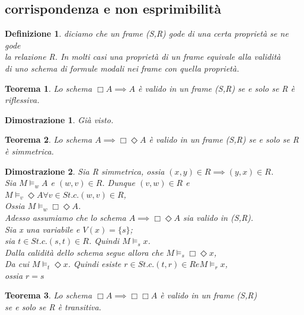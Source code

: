 \documentclass[a4paper,12pt]{article}
\theoremstyle{def}
\newtheorem*{definition}{Definizione}
\theoremstyle{prop}
\theoremstyle{esempio}
\theoremstyle{dimostrazione}
\newtheorem*{dimostrazione}{Dimostrazione}
\theoremstyle{teo}
\newtheorem*{teorema}{Teorema}
\theoremstyle{osservazione}
\begin{document}
\subsection{corrispondenza e non esprimibilità}
\begin{definition}
	diciamo che un frame (S,R) gode di una certa proprietà se ne gode\\
	la relazione R. In molti casi una proprietà di un frame equivale alla validità\\
	di uno schema di formule modali nei frame con quella proprietà.\\
\end{definition}
\begin{teorema}
	Lo schema \(\Box A \implies A\) è valido in un frame (S,R) se e solo se R è riflessiva.
\end{teorema}
\begin{dimostrazione}
	Già visto.
\end{dimostrazione}
\begin{teorema}
	Lo schema \( A \implies \Box \Diamond A\) è valido in un frame (S,R) se e solo se R è simmetrica.
\end{teorema}
\begin{dimostrazione}
	Sia R simmetrica, ossia \((x,y) \in R \implies (y,x) \in R\).\\
	Sia \(M \vDash_w A\) e \((w,v) \in R\). Dunque \((v,w) \in R\) e \(M \vDash_v \Diamond A \forall v \in S t.c. (w,v) \in R\),\\
	Ossia \(M \vDash_w \Box \Diamond A\).\\
	Adesso assumiamo che lo schema \(A \implies \Box \Diamond A \) sia valido in (S,R).\\
	Sia x una variabile e \(V(x) = \{s\}\);\\
	sia \(t \in S t.c. (s,t) \in R\). Quindi \(M \vDash_s x\).\\
	Dalla calidità dello schema segue allora che \(M \vDash_s \Box \Diamond x\),\\
	Da cui \(M \vDash_t \Diamond x\). Quindi esiste \(r \in S t.c. (t,r) \in R e M \vDash_r x\),\\
	ossia \(r = s\)
\end{dimostrazione}
\begin{teorema}
	Lo schema \(\Box A \implies \Box \Box A\) è valido in un frame (S,R)\\
	 se e solo se R è transitiva.
\end{teorema}
\end{document}
